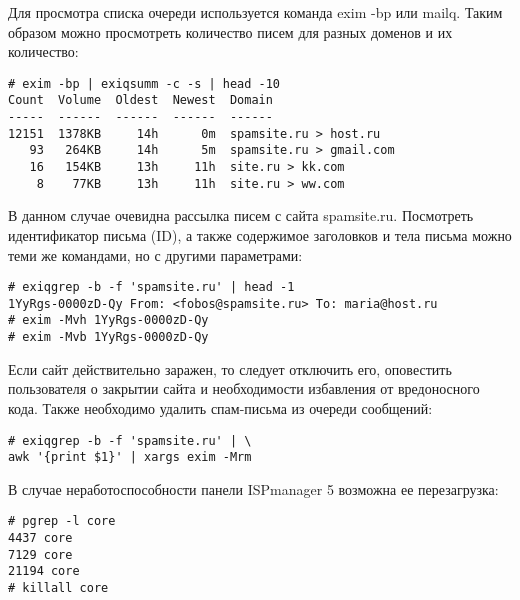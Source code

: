 Для просмотра списка очереди используется команда exim -bp или mailq.
Таким образом можно просмотреть количество писем для разных доменов и их количество:
\begin{lstlisting}
# exim -bp | exiqsumm -c -s | head -10
Count  Volume  Oldest  Newest  Domain
-----  ------  ------  ------  ------
12151  1378KB     14h      0m  spamsite.ru > host.ru
   93   264KB     14h      5m  spamsite.ru > gmail.com
   16   154KB     13h     11h  site.ru > kk.com
    8    77KB     13h     11h  site.ru > ww.com
\end{lstlisting}

В данном случае очевидна рассылка писем с сайта spamsite.ru.
Посмотреть идентификатор письма (ID), а также содержимое заголовков и тела письма можно теми же командами, но с другими параметрами:
\begin{lstlisting}
# exiqgrep -b -f 'spamsite.ru' | head -1
1YyRgs-0000zD-Qy From: <fobos@spamsite.ru> To: maria@host.ru
# exim -Mvh 1YyRgs-0000zD-Qy
# exim -Mvb 1YyRgs-0000zD-Qy
\end{lstlisting}

Если сайт действительно заражен, то следует отключить его, оповестить пользователя о закрытии сайта и необходимости избавления от вредоносного кода.
Также необходимо удалить спам-письма из очереди сообщений:
\begin{lstlisting}
# exiqgrep -b -f 'spamsite.ru' | \
awk '{print $1}' | xargs exim -Mrm
\end{lstlisting}
В случае неработоспособности панели ISPmanager 5 возможна ее перезагрузка:
\begin{lstlisting}
# pgrep -l core
4437 core
7129 core
21194 core
# killall core
\end{lstlisting}
